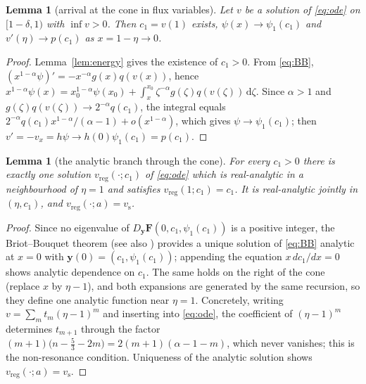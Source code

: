 \documentclass[11pt,a4paper]{amsart}
\newtheorem{lemma}[theorem]{Lemma}
\theoremstyle{definition}
\theoremstyle{remark}
\newcommand{\vs}{v_{\mathrm{s}}}
\newcommand{\vreg}{v_{\mathrm{reg}}}
\newcommand{\dd}{\,\mathrm{d}}
\begin{document}
\begin{lemma}[arrival at the cone in flux variables]\label{lem:arrival}
Let $v$ be a solution of \eqref{eq:ode} on $[1-\delta,1)$ with $\inf v>0$.  Then $c_1=v(1)$ exists, $\psi(x)\to\psi_1(c_1)$ and $v'(\eta)\to p(c_1)$ as $x=1-\eta\to0$.
\end{lemma}
\begin{proof}
Lemma~\ref{lem:energy} gives the existence of $c_1>0$.  From \eqref{eq:BB}, $(x^{1-\alpha}\psi)'=-x^{-\alpha}g(x)q(v(x))$, hence $x^{1-\alpha}\psi(x)=x_0^{1-\alpha}\psi(x_0)+\int_x^{x_0}\zeta^{-\alpha}g(\zeta)q(v(\zeta))\dd\zeta$.  Since $\alpha>1$ and $g(\zeta)q(v(\zeta))\to2^{-\alpha}q(c_1)$, the integral equals $2^{-\alpha}q(c_1)x^{1-\alpha}/(\alpha-1)+o(x^{1-\alpha})$, which gives $\psi\to\psi_1(c_1)$; then $v'=-v_x=h\psi\to h(0)\psi_1(c_1)=p(c_1)$.
\end{proof}

\begin{lemma}[the analytic branch through the cone]\label{lem:analytic}
For every $c_1>0$ there is exactly one solution $\vreg(\cdot;c_1)$ of \eqref{eq:ode} which is real-analytic in a neighbourhood of $\eta=1$ and satisfies $\vreg(1;c_1)=c_1$.  It is real-analytic jointly in $(\eta,c_1)$, and $\vreg(\cdot;a)=\vs$.
\end{lemma}
\begin{proof}
Since no eigenvalue of $D_{\mathbf y}\mathbf F(0,c_1,\psi_1(c_1))$ is a positive integer, the Briot--Bouquet theorem \cite[Ch.~11]{Hil76} (see also \cite[Ch.~2]{IKSY91}) provides a unique solution of \eqref{eq:BB} analytic at $x=0$ with $\mathbf y(0)=(c_1,\psi_1(c_1))$; appending the equation $x\,dc_1/dx=0$ shows analytic dependence on $c_1$.  The same holds on the right of the cone (replace $x$ by $\eta-1$), and both expansions are generated by the same recursion, so they define one analytic function near $\eta=1$.  Concretely, writing $v=\sum_m t_m(\eta-1)^m$ and inserting into \eqref{eq:ode}, the coefficient of $(\eta-1)^m$ determines $t_{m+1}$ through the factor $(m+1)\big(n-\frac53-2m\big)=2(m+1)(\alpha-1-m)$, which never vanishes; this is the non-resonance condition.  Uniqueness of the analytic solution shows $\vreg(\cdot;a)=\vs$.
\end{proof}
\end{document}
